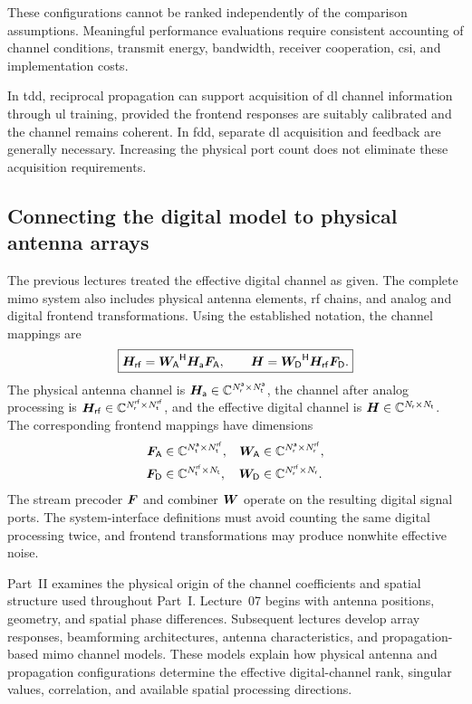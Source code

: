 These configurations cannot be ranked independently of the comparison assumptions. Meaningful performance evaluations require consistent accounting of channel conditions, transmit energy, bandwidth, receiver cooperation, \ac{csi}, and implementation costs.

In \ac{tdd}, reciprocal propagation can support acquisition of \ac{dl} channel information through \ac{ul} training, provided the frontend responses are suitably calibrated and the channel remains coherent. In \ac{fdd}, separate \ac{dl} acquisition and feedback are generally necessary. Increasing the physical port count does not eliminate these acquisition requirements.

\subsection{Connecting the digital model to physical antenna arrays}
The previous lectures treated the effective digital channel as given. The complete \ac{mimo} system also includes physical antenna elements, \ac{rf} chains, and analog and digital frontend transformations. Using the established notation, the channel mappings are
\begin{equation}
	\boxed{
		\bm{H}_{\mathsf{rf}}={\bm{W}_{\mathsf{A}}}^{\mathsf{H}}\bm{H}_{\mathsf{a}}\bm{F}_{\mathsf{A}},
		\qquad
		\bm{H}={\bm{W}_{\mathsf{D}}}^{\mathsf{H}}\bm{H}_{\mathsf{rf}}\bm{F}_{\mathsf{D}}.
	}
	\label{eq06:frontend}
\end{equation}
The physical antenna channel is $\bm{H}_{\mathsf{a}}\in\mathbb{C}^{N_{\mathsf{r}}^{\mathsf{a}}\times N_{\mathsf{t}}^{\mathsf{a}}}$, the channel after analog processing is $\bm{H}_{\mathsf{rf}}\in\mathbb{C}^{N_{\mathsf{r}}^{\mathsf{rf}}\times N_{\mathsf{t}}^{\mathsf{rf}}}$, and the effective digital channel is $\bm{H}\in\mathbb{C}^{N_{\mathsf{r}}\times N_{\mathsf{t}}}$. The corresponding frontend mappings have dimensions
\begin{equation*}
	\begin{aligned}
		\bm{F}_{\mathsf{A}}&\in\mathbb{C}^{N_{\mathsf{t}}^{\mathsf{a}}\times N_{\mathsf{t}}^{\mathsf{rf}}},
		&\bm{W}_{\mathsf{A}}&\in\mathbb{C}^{N_{\mathsf{r}}^{\mathsf{a}}\times N_{\mathsf{r}}^{\mathsf{rf}}},\\
		\bm{F}_{\mathsf{D}}&\in\mathbb{C}^{N_{\mathsf{t}}^{\mathsf{rf}}\times N_{\mathsf{t}}},
		&\bm{W}_{\mathsf{D}}&\in\mathbb{C}^{N_{\mathsf{r}}^{\mathsf{rf}}\times N_{\mathsf{r}}}.
	\end{aligned}
\end{equation*}
The stream precoder $\bm{F}$ and combiner $\bm{W}$ operate on the resulting digital signal ports. The system-interface definitions must avoid counting the same digital processing twice, and frontend transformations may produce nonwhite effective noise.

Part~II examines the physical origin of the channel coefficients and spatial structure used throughout Part~I. Lecture~07 begins with antenna positions, geometry, and spatial phase differences. Subsequent lectures develop array responses, beamforming architectures, antenna characteristics, and propagation-based \ac{mimo} channel models. These models explain how physical antenna and propagation configurations determine the effective digital-channel rank, singular values, correlation, and available spatial processing directions.


